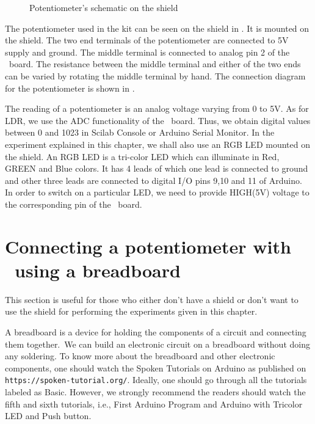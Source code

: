 \begin{figure}
\centering
{} \hfill
{}
\caption{Potentiometer's schematic on the shield}
\label{fig:potmeterconn}
\end{figure}

The potentiometer used in the kit can be seen on the shield in
.  It is
mounted on the shield. The two end terminals of the potentiometer are
connected to 5V supply and ground. The middle terminal is connected to
analog pin 2 of the \arduino\ board. The resistance between the middle
terminal and either of the two ends can be varied by rotating the
middle terminal by hand. The connection diagram for the potentiometer
is shown in .

The reading of a potentiometer is an analog voltage varying from 0 to
5V. As for LDR, we use the ADC functionality of the
\arduino\ board. Thus, we obtain digital values between 0 and 1023 in
Scilab Console or Arduino Serial Monitor.
In the experiment explained in this chapter, we shall also use an RGB
LED mounted on the shield. An RGB LED is a tri-color LED which can
illuminate in Red, GREEN and Blue colors. It has 4 leads of which one
lead is connected to ground and other three leads are connected to
digital I/O pins 9,10 and 11 of Arduino. In order to switch on a
particular LED, we need to provide HIGH(5V) voltage to the
corresponding pin of the \arduino\ board.

\section{Connecting a potentiometer with \arduino\ using a breadboard}
This section is useful for those who either don't have a shield or don't want to use the shield
for performing the experiments given in this chapter. 

A breadboard is a device for holding the components of a circuit and connecting 
them together. We can build an electronic circuit on a breadboard without doing any 
soldering. To know more about the breadboard and other electronic components, 
one should watch the Spoken Tutorials on Arduino as published on
{\tt https://spoken-tutorial.org/}. Ideally, one should go through all the
tutorials labeled as Basic. However, we strongly recommend the readers should
watch the fifth and sixth tutorials, i.e., First Arduino Program and 
Arduino with Tricolor LED and Push button.

